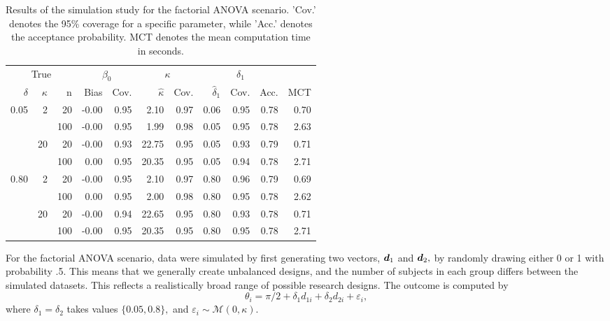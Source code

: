 \begin{table}[btp]
\centering
\begin{small}
\caption{Results of the simulation study for the factorial ANOVA scenario. 'Cov.' denotes the 95\% coverage for a specific parameter, while 'Acc.' denotes the acceptance probability. MCT denotes the mean computation time in seconds.} 
\label{tableFacANOVA}
\begin{tabular}{rrrrrrrrrrr}
  \toprule \multicolumn{3}{c}{True} & \multicolumn{2}{c}{$\beta_0$} & \multicolumn{2}{c}{$\kappa$} & \multicolumn{3}{c}{$\delta_1$} & \\  \cmidrule(lr){1-3} \cmidrule(lr){4-5} \cmidrule(lr){6-7} \cmidrule(lr){8-10}$\delta$ & $\kappa$ & n & Bias & Cov. & $\hat{\kappa}$ & Cov. & $\hat{\delta}_1$ & Cov. & Acc. & MCT \\ 
  \midrule
0.05 & 2 & 20 & -0.00 & 0.95 & 2.10 & 0.97 & 0.06 & 0.95 & 0.78 & 0.70 \\ 
   \vspace{0.2cm}  &  & 100 & -0.00 & 0.95 & 1.99 & 0.98 & 0.05 & 0.95 & 0.78 & 2.63 \\ 
   & 20 & 20 & -0.00 & 0.93 & 22.75 & 0.95 & 0.05 & 0.93 & 0.79 & 0.71 \\ 
   \vspace{0.2cm}  &  & 100 & 0.00 & 0.95 & 20.35 & 0.95 & 0.05 & 0.94 & 0.78 & 2.71 \\ 
  0.80 & 2 & 20 & -0.00 & 0.95 & 2.10 & 0.97 & 0.80 & 0.96 & 0.79 & 0.69 \\ 
   \vspace{0.2cm}  &  & 100 & 0.00 & 0.95 & 2.00 & 0.98 & 0.80 & 0.95 & 0.78 & 2.62 \\ 
   & 20 & 20 & -0.00 & 0.94 & 22.65 & 0.95 & 0.80 & 0.93 & 0.78 & 0.71 \\ 
   &  & 100 & -0.00 & 0.95 & 20.35 & 0.95 & 0.80 & 0.95 & 0.78 & 2.71 \\ 
   \bottomrule
\end{tabular}
\end{small}
\end{table}


For the factorial ANOVA scenario, data were simulated by first generating two vectors, \( \boldsymbol{d}_1 \) and \( \boldsymbol{d}_2,\) by randomly drawing either 0 or 1 with probability .5. This means that we generally create unbalanced designs, and the number of subjects in each group differs between the simulated datasets. This reflects a realistically broad range of possible research designs. The outcome is computed by
\begin{equation}
\theta_i = \pi/2 + \delta_1 d_{1i} + \delta_2 d_{2i} + \varepsilon_i,
\end{equation}
where \( \delta_1 = \delta_2 \) takes values \( \{ 0.05, 0.8 \},\) and \( \varepsilon_i \sim \mathcal{M}(0, \kappa).\)

